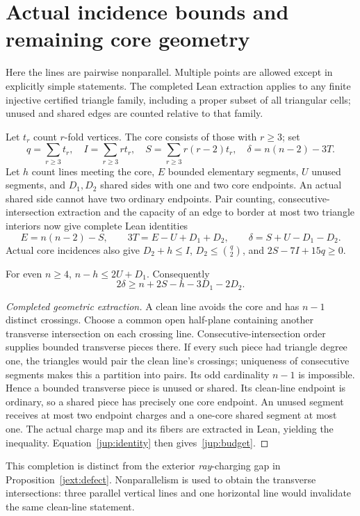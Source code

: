 \section{Actual incidence bounds and remaining core geometry}
\label{jup:section}

Here the lines are pairwise nonparallel. Multiple points are allowed except in explicitly simple statements. The completed Lean extraction applies to any finite injective certified triangle family, including a proper subset of all triangular cells; unused and shared edges are counted relative to that family.

Let $t_r$ count $r$-fold vertices. The core consists of those with $r\ge3$; set
\[
 q=\sum_{r\ge3}t_r,\quad I=\sum_{r\ge3}rt_r,\quad
 S=\sum_{r\ge3}r(r-2)t_r,\quad\delta=n(n-2)-3T.
\]
Let $h$ count lines meeting the core, $E$ bounded elementary segments, $U$ unused segments, and $D_1,D_2$ shared sides with one and two core endpoints. An actual shared side cannot have two ordinary endpoints. Pair counting, consecutive-intersection extraction and the capacity of an edge to border at most two triangle interiors now give complete Lean identities
\begin{equation}\label{jup:identity}
 E=n(n-2)-S,\qquad3T=E-U+D_1+D_2,\qquad
 \delta=S+U-D_1-D_2.
\end{equation}
Actual core incidences also give $D_2+h\le I$, $D_2\le\binom q2$, and $2S-7I+15q\ge0$.

\begin{lemma}\label{jup:clean}
For even $n\ge4$, $n-h\le2U+D_1$. Consequently
\begin{equation}\label{jup:budget}
 2\delta\ge n+2S-h-3D_1-2D_2.
\end{equation}
\end{lemma}
\begin{proof}[Completed geometric extraction]
A clean line avoids the core and has $n-1$ distinct crossings. Choose a common open half-plane containing another transverse intersection on each crossing line. Consecutive-intersection order supplies bounded transverse pieces there. If every such piece had triangle degree one, the triangles would pair the clean line's crossings; uniqueness of consecutive segments makes this a partition into pairs. Its odd cardinality $n-1$ is impossible. Hence a bounded transverse piece is unused or shared. Its clean-line endpoint is ordinary, so a shared piece has precisely one core endpoint. An unused segment receives at most two endpoint charges and a one-core shared segment at most one. The actual charge map and its fibers are extracted in Lean, yielding the inequality. Equation~\eqref{jup:identity} then gives~\eqref{jup:budget}.
\end{proof}
This completion is distinct from the exterior \emph{ray}-charging gap in Proposition~\ref{jext:defect}. Nonparallelism is used to obtain the transverse intersections: three parallel vertical lines and one horizontal line would invalidate the same clean-line statement.

